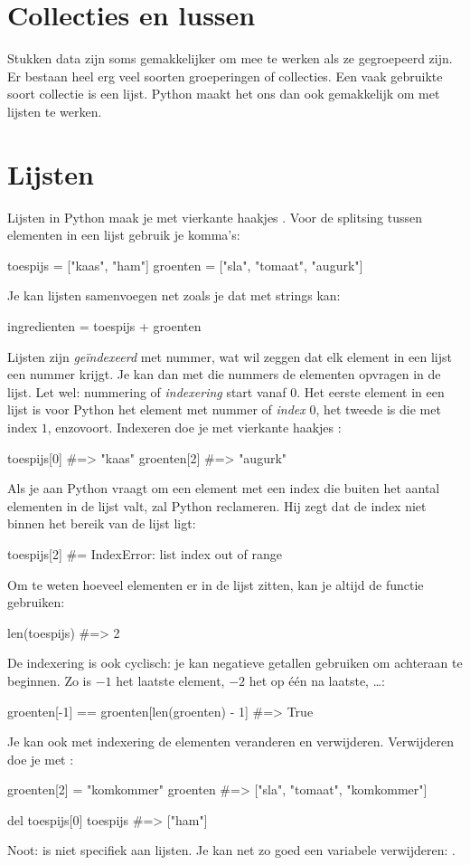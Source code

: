 
\section*{Collecties en lussen}
  Stukken data zijn soms gemakkelijker om mee te werken als ze gegroepeerd zijn.
  Er bestaan heel erg veel soorten groeperingen of collecties. Een vaak
  gebruikte soort collectie is een lijst. Python maakt het ons dan ook
  gemakkelijk om met lijsten te werken.

\section{Lijsten}
  Lijsten in Python maak je met vierkante haakjes \py{[\,]}. Voor de splitsing
  tussen elementen in een lijst gebruik je komma's:
  \begin{python}
    toespijs = ["kaas", "ham"]
    groenten = ["sla", "tomaat", "augurk"]
  \end{python}
  Je kan lijsten samenvoegen net zoals je dat met strings kan:
  \begin{python}
    ingredienten = toespijs + groenten
  \end{python}
  Lijsten zijn \emph{ge\"indexeerd} met nummer, wat wil zeggen dat elk element
  in een lijst een nummer krijgt. Je kan dan met die nummers de elementen
  opvragen in de lijst. Let wel: nummering of \emph{indexering} start vanaf $0$.
  Het eerste element in een lijst is voor Python het element met nummer of
  \emph{index} $0$, het tweede is die met index $1$, enzovoort. Indexeren doe je
  met vierkante haakjes \py{[\,]}:
  \begin{python}
    toespijs[0]   #=> "kaas"
    groenten[2]   #=> "augurk"
  \end{python}
  Als je aan Python vraagt om een element met een index die buiten het aantal
  elementen in de lijst valt, zal Python reclameren. Hij zegt dat de index niet
  binnen het bereik van de lijst ligt:
  \begin{python}
    toespijs[2]   #= IndexError: list index out of range
  \end{python}
  Om te weten hoeveel elementen er in de lijst zitten, kan je altijd de functie
   gebruiken:
  \begin{python}
    len(toespijs) #=> 2
  \end{python}
  De indexering is ook cyclisch: je kan negatieve getallen gebruiken om
  achteraan te beginnen. Zo is $-1$ het laatste element, $-2$ het op \'e\'en na
  laatste, \ldots:
  \begin{python}
    groenten[-1] == groenten[len(groenten) - 1] #=> True
  \end{python}
  Je kan ook met indexering de elementen veranderen en verwijderen.
  Verwijderen doe je met :
  \begin{python}
    groenten[2] = "komkommer"
    groenten  #=> ["sla", "tomaat", "komkommer"]

    del toespijs[0]
    toespijs  #=> ["ham"]
  \end{python}
  Noot:  is niet specifiek aan lijsten. Je kan net zo goed een variabele
  verwijderen: .

